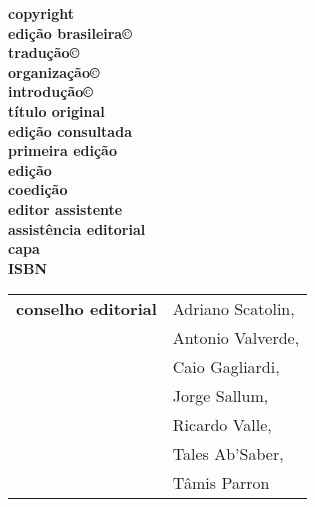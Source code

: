 \newcommand{\linha}[2]{\ifdef{#2}{\linhalayout{#1}{#2}}{}}

\begingroup\tiny
\parindent=0cm
\thispagestyle{empty}

\textbf{copyright}\quad                      	  {}\\
\textbf{edição brasileira©}\\
\textbf{tradução©}\\
\textbf{organização©}\\
\textbf{introdução©}\\

\textbf{título original}\\
\textbf{edição consultada}\\
\textbf{primeira edição}\\

\textbf{edição}\\
\textbf{coedição}\\
\textbf{editor assistente}\\	
\textbf{assistência editorial}\\
\textbf{capa}\\

\textbf{ISBN}\smallskip

\hspace{-5pt}\begin{tabular}{ll}
\textbf{conselho editorial}        & Adriano Scatolin,  \\
							& Antonio Valverde,  \\
							& Caio Gagliardi,    \\
							& Jorge Sallum,      \\
							& Ricardo Valle,     \\
							& Tales Ab'Saber,    \\
							& Tâmis Parron      
\end{tabular}
  
